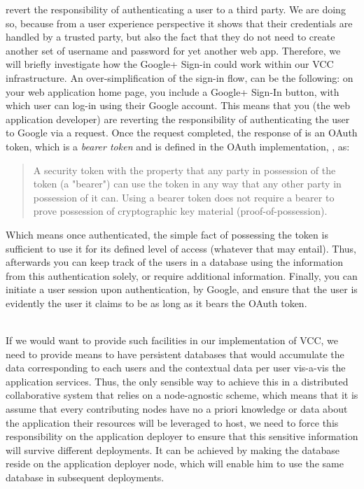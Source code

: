 \documentclass[11pt]{amsart}
\begin{document}
\begin{enumarate}
          revert the responsibility of authenticating a user to a third party. We are
          doing so, because from a user experience perspective it shows that their
          credentials are handled by a trusted party, but also the fact that they do not
          need to create another set of username and password for yet another web
          app. Therefore, we will briefly investigate how the Google+ Sign-in could work
          within our VCC infrastructure. An over-simplification of the sign-in flow, can
          be the following: on your web application home page, you include a Google+
          Sign-In button, with which user can log-in using their Google account. This
          means that you (the web application developer) are reverting the responsibility
          of authenticating the user to Google via a request. Once the request completed, the
          response of is an OAuth token, which is a \emph{bearer token} and is defined in
          the OAuth implementation, \cite{jones2012oauth}, as:
          \begin{quote}
             A security token with the property that any party in possession of the token
             (a "bearer") can use the token in any way that any other party in
             possession of it can.  Using a bearer token does not require a bearer to
             prove possession of cryptographic key material (proof-of-possession).
          \end{quote}
          Which means once authenticated, the simple fact of possessing the token is
          sufficient to use it for its defined level of access (whatever that may
          entail). Thus, afterwards you can keep track of the users in a database using
          the information from this authentication solely, or require additional
          information. Finally, you can initiate a user session upon authentication, by
          Google, and ensure that the user is evidently the user it claims to be as long
          as it bears the OAuth token. 
          
          \\ If we would want to provide such facilities in our implementation of VCC, we
          need to provide means to have persistent databases that would accumulate the
          data corresponding to each users and the contextual data per user vis-a-vis the
          application services. Thus, the only sensible way to achieve this in a
          distributed collaborative system that relies on a node-agnostic scheme, which
          means that it is assume that every contributing nodes have no a priori knowledge
          or data about the application their resources will be leveraged to host, we need
          to force this responsibility on the application deployer to ensure that this
          sensitive information will survive different deployments. It can be achieved by
          making the database reside on the application deployer node, which will enable
          him to use the same database in subsequent deployments.


\end{enumarate}
\end{document}
